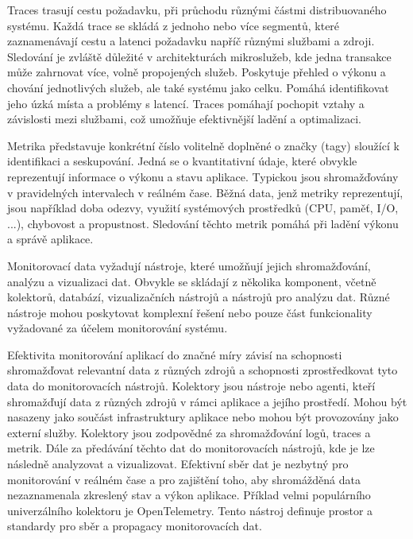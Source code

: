 
Traces trasují cestu požadavku, při průchodu různými částmi distribuovaného systému. Každá trace se skládá z jednoho nebo více segmentů, které zaznamenávají cestu a latenci požadavku napříč různými službami a zdroji. Sledování je zvláště důležité v architekturách mikroslužeb, kde jedna transakce může zahrnovat více, volně propojených služeb. Poskytuje přehled o výkonu a chování jednotlivých služeb, ale také systému jako celku. Pomáhá identifikovat jeho úzká místa a problémy s latencí. \cite{Molkova2023} Traces pomáhají pochopit vztahy a závislosti mezi službami, což umožňuje efektivnější ladění a optimalizaci.


Metrika představuje konkrétní číslo volitelně doplněné o značky (tagy) sloužící k identifikaci a seskupování. \cite{Majors2022} Jedná se o kvantitativní údaje, které obvykle reprezentují informace o výkonu a stavu aplikace. Typickou jsou shromažďovány v pravidelných intervalech v reálném čase. Běžná data, jenž metriky reprezentují, jsou například doba odezvy, využití systémových prostředků (CPU, paměť, I/O, ...), chybovost a propustnost. Sledování těchto metrik pomáhá při ladění výkonu a správě aplikace.


Monitorovací data vyžadují nástroje, které umožňují jejich shromažďování, analýzu a vizualizaci dat. Obvykle se skládají z několika komponent, včetně kolektorů, databází, vizualizačních nástrojů a nástrojů pro analýzu dat. \cite{Riedesel2021} Různé nástroje mohou poskytovat komplexní řešení nebo pouze část funkcionality vyžadované za účelem monitorování systému.


Efektivita monitorování aplikací do značné míry závisí na schopnosti shromažďovat relevantní data z různých zdrojů a schopnosti zprostředkovat tyto data do monitorovacích nástrojů. Kolektory jsou nástroje nebo agenti, kteří shromažďují data z různých zdrojů v rámci aplikace a jejího prostředí. \cite{Blanco2023} Mohou být nasazeny jako součást infrastruktury aplikace nebo mohou být provozovány jako externí služby. Kolektory jsou zodpovědné za shromažďování logů, traces a metrik. Dále za předávání těchto dat do monitorovacích nástrojů, kde je lze následně analyzovat a vizualizovat. Efektivní sběr dat je nezbytný pro monitorování v reálném čase a pro zajištění toho, aby shromážděná data nezaznamenala zkreslený stav a výkon aplikace. Příklad velmi populárního univerzálního kolektoru je OpenTelemetry. Tento nástroj definuje prostor a standardy pro sběr a propagacy monitorovacích dat. \cite{Blanco2023}

